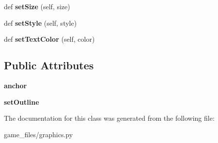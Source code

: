 \begin{DoxyCompactItemize}
\item 
def {\bfseries set\+Size} (self, size)\hypertarget{classgraphics_1_1Text_a31ea18b7a09603cdb49a4716290ec8fe}{}\label{classgraphics_1_1Text_a31ea18b7a09603cdb49a4716290ec8fe}

\item 
def {\bfseries set\+Style} (self, style)\hypertarget{classgraphics_1_1Text_af2697684710c7471abe9bc8bf0f5fffe}{}\label{classgraphics_1_1Text_af2697684710c7471abe9bc8bf0f5fffe}

\item 
def {\bfseries set\+Text\+Color} (self, color)\hypertarget{classgraphics_1_1Text_a4ee730f2d0f9a81250b8ca232940fec8}{}\label{classgraphics_1_1Text_a4ee730f2d0f9a81250b8ca232940fec8}

\end{DoxyCompactItemize}
\subsection*{Public Attributes}
\begin{DoxyCompactItemize}
\item 
{\bfseries anchor}\hypertarget{classgraphics_1_1Text_a24a6cb5416b56cc809da0a358de69db7}{}\label{classgraphics_1_1Text_a24a6cb5416b56cc809da0a358de69db7}

\item 
{\bfseries set\+Outline}\hypertarget{classgraphics_1_1Text_a9b7d6fa2325a028c73778227d8f9ac99}{}\label{classgraphics_1_1Text_a9b7d6fa2325a028c73778227d8f9ac99}

\end{DoxyCompactItemize}


The documentation for this class was generated from the following file\+:\begin{DoxyCompactItemize}
\item 
game\+\_\+files/graphics.\+py\end{DoxyCompactItemize}
